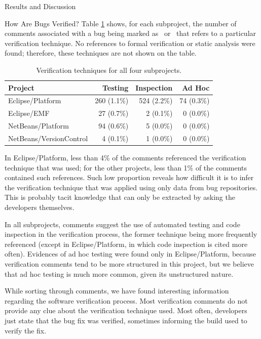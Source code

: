 \begin{section}{Results and Discussion}
\begin{subsection}{How Are Bugs Verified?}
	Table \ref{tab:how} shows, for each subproject, the number of comments associated with a bug being marked as \VERIFIED\ or \REOPENED\ that refers to a particular verification technique. No references to formal verification or static analysis were found; therefore, these techniques are not shown on the table.

	\begin{table}
		\begin{center}
		\caption{Verification techniques for all four subprojects.}
		\begin{tabular}{l|r|r|r}
			\textbf{\centering Project} & 
			\textbf{\centering Testing} & 
			\textbf{\centering Inspection} & 
			\textbf{\centering Ad Hoc} \\
			\hline
			Eclipse/Platform        & 260 (1.1\%) & 524 (2.2\%) & 74 (0.3\%) \\
			Eclipse/EMF             & 27 (0.7\%) & 2 (0.1\%) & 0 (0.0\%) \\
			NetBeans/Platform       & 94 (0.6\%) & 5 (0.0\%) & 0 (0.0\%) \\
			NetBeans/VersionControl & 4 (0.1\%) & 1 (0.0\%) & 0 (0.0\%) 
		\end{tabular}
		\end{center}
		
		\label{tab:how}
	\end{table}

	In Eclipse/Platform, less than 4\% of the comments referenced the verification technique that was used; for the other projects, less than 1\% of the comments contained such references. Such low proportion reveals how difficult it is to infer the verification technique that was applied using only data from bug repositories. This is probably tacit knowledge that can only be extracted by asking the developers themselves.
	
	In all subprojects, comments suggest the use of automated testing and code inspection in the verification process, the former technique being more frequently referenced (except in Eclipse/Platform, in which code inspection is cited more often). Evidences of ad hoc testing were found only in Eclipse/Platform, because verification comments tend to be more structured in this project, but we believe that ad hoc testing is much more common, given its unstructured nature.
	
	While sorting through comments, we have found interesting information regarding the software verification process. Most verification comments do not provide any clue about the verification technique used. Most often, developers just state that the bug fix was verified, sometimes informing the build used to verify the fix. 
  

\end{subsection}
\end{section}
